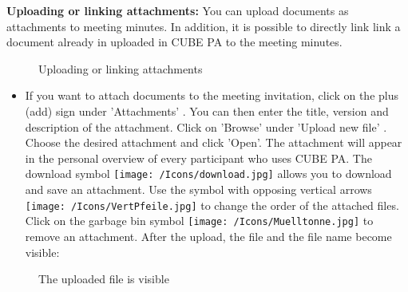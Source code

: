 \textbf{Uploading or linking attachments:}
You can upload documents as attachments to meeting minutes. In addition, it is possible to directly link link a document already in uploaded in CUBE PA to the meeting minutes.  

\vspace{\baselineskip}

\begin{figure}[H]
\caption{Uploading or linking attachments}
\end{figure}

\vspace{\baselineskip}

\begin{itemize}
\item 
If you want to attach documents to the meeting invitation, click on the plus (add) sign under 'Attachments' . You can then enter the title, version and description of the attachment. Click on 'Browse' under 'Upload new file' . Choose the desired attachment and click 'Open'. The attachment will appear in the personal overview of every participant who uses CUBE PA. The download symbol \texttt{[image: /Icons/download.jpg]}  allows you to download and save an attachment. Use the symbol with opposing vertical arrows \texttt{[image: /Icons/VertPfeile.jpg]} to change the order of the attached files. Click on the garbage bin symbol \texttt{[image: /Icons/Muelltonne.jpg]}  to remove an attachment. After the upload, the file and the file name become visible:
\end{itemize}

\begin{figure}[H]
\caption{The uploaded file is visible}
\end{figure}

